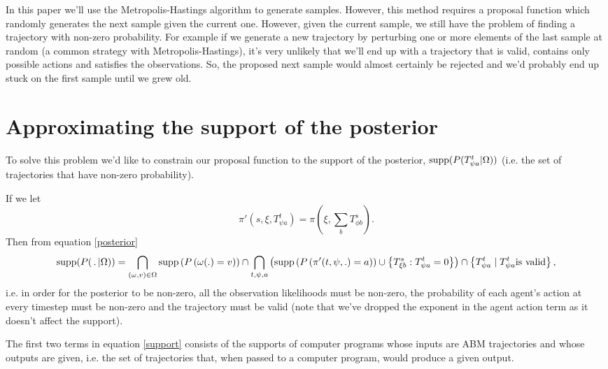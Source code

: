 In this paper we'll use the Metropolis-Hastings algorithm to generate samples. However, this method requires a proposal function which randomly generates the next sample given the current one. However, given the current sample, we still have the problem of finding a trajectory with non-zero probability. For example if we generate a new trajectory by perturbing one or more elements of the last sample at random (a common strategy with Metropolis-Hastings), it's very unlikely that we'll end up with a trajectory that is valid, contains only possible actions and satisfies the observations. So, the proposed next sample would almost certainly be rejected and we'd probably end up stuck on the first sample until we grew old.

\section{Approximating the support of the posterior}


To solve this problem we'd like to constrain our proposal function to the support of the posterior, $\operatorname{supp}(P(T^t_{\psi a}|\Omega))$ (i.e. the set of trajectories that have non-zero probability).

If we let
\[
\pi'(s, \xi, T^t_{\psi a}) = \pi(\xi,\sum_bT^{s}_{\phi b}).
\]
Then from equation \ref{posterior}
\begin{equation}
\operatorname{supp} (P( \,.\, |\Omega)) = 
\bigcap_{(\omega,v) \in \Omega}  \operatorname{supp}\left(P\left(\omega(.)=v\right)\right) \cap
\bigcap_{t, \psi, a} \left(\operatorname{supp}\left(P\left( \pi'(t,\psi,.) = a \right)\right) \cup \left\{T^s_{\xi b}: T^t_{\psi a} = 0\right\}\right) \cap
\left\{T^t_{\psi a} \mid T^t_{\psi a} \text{is valid}\right\},
\label{support}
\end{equation}
i.e. in order for the posterior to be non-zero, all the observation likelihoods must be non-zero, the probability of each agent's action at every timestep must be non-zero and the trajectory must be valid (note that we've dropped the exponent in the agent action term as it doesn't affect the support).

The first two terms in equation \ref{support} consists of the supports of computer programs whose inputs are ABM trajectories and whose outputs are given, i.e. the set of trajectories that, when passed to a computer program, would produce a given output.

